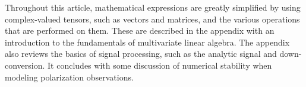 Throughout this article, mathematical expressions are greatly simplified by using complex-valued tensors, such as vectors and matrices, and the various operations that are performed on them.  These are described in the appendix with an introduction to
the fundamentals of multivariate linear algebra.
%
The appendix also reviews the basics of signal processing, such as the analytic signal and down-conversion.
%
It concludes with some discussion of numerical stability when modeling polarization observations.
